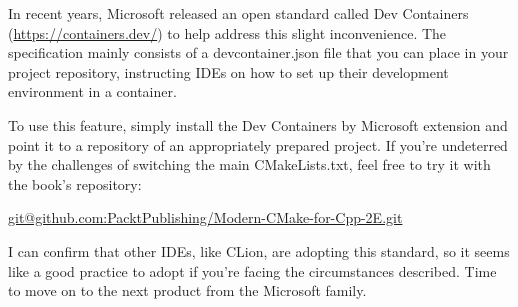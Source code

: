 In recent years, Microsoft released an open standard called Dev Containers (\url{https://containers.dev/}) to help address this slight inconvenience. The specification mainly consists of a devcontainer.json file that you can place in your project repository, instructing IDEs on how to set up their development environment in a container.

To use this feature, simply install the Dev Containers by Microsoft extension and point it to a repository of an appropriately prepared project. If you’re undeterred by the challenges of switching the main CMakeLists.txt, feel free to try it with the book’s repository:

\url{git@github.com:PacktPublishing/Modern-CMake-for-Cpp-2E.git}

I can confirm that other IDEs, like CLion, are adopting this standard, so it seems like a good practice to adopt if you’re facing the circumstances described. Time to move on to the next product from the Microsoft family.


















